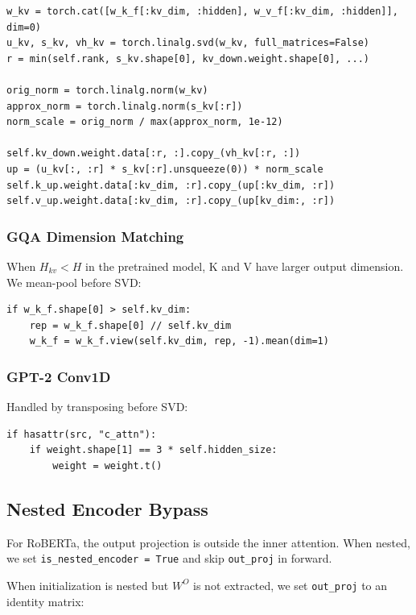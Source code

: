 \begin{lstlisting}
w_kv = torch.cat([w_k_f[:kv_dim, :hidden], w_v_f[:kv_dim, :hidden]], dim=0)
u_kv, s_kv, vh_kv = torch.linalg.svd(w_kv, full_matrices=False)
r = min(self.rank, s_kv.shape[0], kv_down.weight.shape[0], ...)

orig_norm = torch.linalg.norm(w_kv)
approx_norm = torch.linalg.norm(s_kv[:r])
norm_scale = orig_norm / max(approx_norm, 1e-12)

self.kv_down.weight.data[:r, :].copy_(vh_kv[:r, :])
up = (u_kv[:, :r] * s_kv[:r].unsqueeze(0)) * norm_scale
self.k_up.weight.data[:kv_dim, :r].copy_(up[:kv_dim, :r])
self.v_up.weight.data[:kv_dim, :r].copy_(up[kv_dim:, :r])
\end{lstlisting}

\subsubsection{GQA Dimension Matching}

When $H_{kv} < H$ in the pretrained model, K and V have larger output 
dimension. We mean-pool before SVD:

\begin{lstlisting}
if w_k_f.shape[0] > self.kv_dim:
    rep = w_k_f.shape[0] // self.kv_dim
    w_k_f = w_k_f.view(self.kv_dim, rep, -1).mean(dim=1)
\end{lstlisting}

\subsubsection{GPT-2 Conv1D}

Handled by transposing before SVD:

\begin{lstlisting}
if hasattr(src, "c_attn"):
    if weight.shape[1] == 3 * self.hidden_size:
        weight = weight.t()
\end{lstlisting}

\subsection{Nested Encoder Bypass}

For RoBERTa, the output projection is outside the inner attention. When 
nested, we set \texttt{is\_nested\_encoder = True} and skip \texttt{out\_proj} in forward.

When initialization is nested but $W^O$ is not extracted, we set 
\texttt{out\_proj} to an identity matrix:

